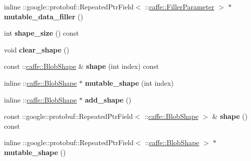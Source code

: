 \begin{DoxyCompactItemize}
\item 
\mbox{\label{classcaffe_1_1_dummy_data_parameter_a6ede84a72edf8b5ec8c2060edacd3b68}} 
inline \+::google\+::protobuf\+::\+Repeated\+Ptr\+Field$<$ \+::\mbox{\hyperlink{classcaffe_1_1_filler_parameter}{caffe\+::\+Filler\+Parameter}} $>$ $\ast$ {\bfseries mutable\+\_\+data\+\_\+filler} ()
\item 
\mbox{\label{classcaffe_1_1_dummy_data_parameter_afe030d2284c80ed232d1629907746ff3}} 
int {\bfseries shape\+\_\+size} () const
\item 
\mbox{\label{classcaffe_1_1_dummy_data_parameter_a3c5d8f18bacce9cf1627795008f73ebb}} 
void {\bfseries clear\+\_\+shape} ()
\item 
\mbox{\label{classcaffe_1_1_dummy_data_parameter_aefad70b8a42070d92f6783ecb5499c36}} 
const \+::\mbox{\hyperlink{classcaffe_1_1_blob_shape}{caffe\+::\+Blob\+Shape}} \& {\bfseries shape} (int index) const
\item 
\mbox{\label{classcaffe_1_1_dummy_data_parameter_a9eedff7288b1580f512df7b682014e94}} 
inline \+::\mbox{\hyperlink{classcaffe_1_1_blob_shape}{caffe\+::\+Blob\+Shape}} $\ast$ {\bfseries mutable\+\_\+shape} (int index)
\item 
\mbox{\label{classcaffe_1_1_dummy_data_parameter_a4b5e9910bec4568b443ed64ce1125a4e}} 
inline \+::\mbox{\hyperlink{classcaffe_1_1_blob_shape}{caffe\+::\+Blob\+Shape}} $\ast$ {\bfseries add\+\_\+shape} ()
\item 
\mbox{\label{classcaffe_1_1_dummy_data_parameter_a4bbcd31911b0eb81844e9ed126f959d5}} 
const \+::google\+::protobuf\+::\+Repeated\+Ptr\+Field$<$ \+::\mbox{\hyperlink{classcaffe_1_1_blob_shape}{caffe\+::\+Blob\+Shape}} $>$ \& {\bfseries shape} () const
\item 
\mbox{\label{classcaffe_1_1_dummy_data_parameter_ac38cbcbe6f57fda68c4eed0d31f8eaed}} 
inline \+::google\+::protobuf\+::\+Repeated\+Ptr\+Field$<$ \+::\mbox{\hyperlink{classcaffe_1_1_blob_shape}{caffe\+::\+Blob\+Shape}} $>$ $\ast$ {\bfseries mutable\+\_\+shape} ()

\end{DoxyCompactItemize}
